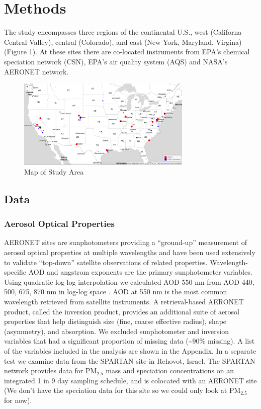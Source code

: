 \documentclass[, manuscript]{copernicus}
\begin{document}
\section{Methods}

The study encompasses three regions of the continental U.S., west
(Californa Central Valley), central (Colorado), and east (New York,
Maryland, Virgina) (Figure 1). At these sites there are co-located
instruments from EPA's chemical speciation network (CSN), EPA's air
quality system (AQS) and NASA's AERONET network.

\begin{figure}
\includegraphics[width=8.3cm]{site_map} \caption{Map of Study Area}\label{fig:unnamed-chunk-1}
\end{figure}

\subsection{Data}

\subsubsection{Aerosol Optical Properties}

AERONET sites are sunphotometers providing a ``ground-up'' measurement
of aerosol optical properties at multiple wavelengths and have been used
extensively to validate ``top-down'' satellite observations of related
properties. Wavelength-specific AOD and angstrom exponents are the
primary sunphotometer variables. Using quadratic log-log interpolation
we calculated AOD 550 nm from AOD 440, 500, 675, 870 nm in log-log space
\cite{Sorek-Hamer2020}. AOD at 550 nm is the most common wavelength
retrieved from satellite instruments. A retrieval-based AERONET product,
called the inversion product, provides an additional suite of aerosol
properties that help distinguish size (fine, coarse effective radius),
shape (asymmetry), and absorption. We excluded sunphotometer and
inversion variables that had a significant proportion of missing data
(\textasciitilde90\% missing). A list of the variables included in the
analysis are shown in the Appendix. In a separate test we examine data
from the SPARTAN site in Rehovot, Israel. The SPARTAN network provides
data for PM\(_{2.5}\) mass and speciation concentrations on an
integrated 1 in 9 day sampling schedule, and is colocated with an
AERONET site (We don't have the speciation data for this site so we
could only look at PM\(_{2.5}\) for now).
\end{document}
